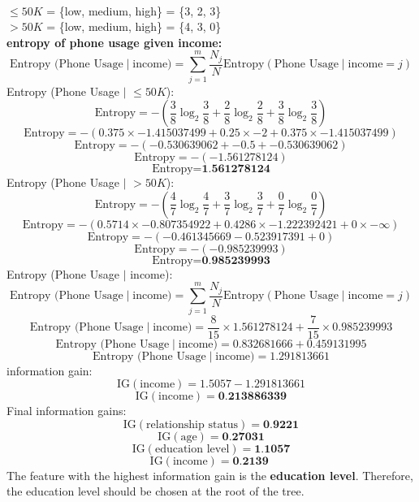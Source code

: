 \documentclass[a3paper,12pt]{extarticle} %
\begin{document}
\begin{enumerate}
    \\ $\leq 50K$ = \{low, medium, high\} = \{3, 2, 3\}
    \\ $> 50K$ = \{low, medium, high\} = \{4, 3, 0\}
    \\ \textbf{entropy of phone usage given income:}
    \[
    \text{Entropy (Phone Usage} \mid \text{income)} = \sum_{j=1}^m \frac{N_j}{N} \text{Entropy}(\text{Phone Usage} \mid \text{income} = j)
    \]
    Entropy (Phone Usage $\mid$ $\leq 50K$):
    \[
    \text{Entropy} = -\left(\frac{3}{8} \log_2 \frac{3}{8} + \frac{2}{8} \log_2 \frac{2}{8} + \frac{3}{8} \log_2 \frac{3}{8}\right)
    \]
    \[
    \text{Entropy} = -\left(0.375 \times -1.415037499 + 0.25 \times -2 + 0.375 \times -1.415037499\right)
    \]
    \[
    \text{Entropy} = -\left(-0.530639062 + -0.5 + -0.530639062\right)
    \]
    \[
    \text{Entropy} = -\left(-1.561278124\right)
    \]
    \[
    \text{Entropy} = \textbf{1.561278124}
    \]
    Entropy (Phone Usage $\mid$ $> 50K$):
    \[
    \text{Entropy} = -\left(\frac{4}{7} \log_2 \frac{4}{7} + \frac{3}{7} \log_2 \frac{3}{7} + \frac{0}{7} \log_2 \frac{0}{7}\right)
    \]
    \[
    \text{Entropy} = -\left(0.5714 \times -0.807354922 + 0.4286 \times -1.222392421 + 0 \times -\infty\right)
    \]
    \[
    \text{Entropy} = -\left(-0.461345669 - 0.523917391 + 0\right)
    \]
    \[
    \text{Entropy} = -\left(-0.985239993\right)
    \]
    \[
    \text{Entropy} = \textbf{0.985239993}
    \]
    Entropy (Phone Usage $\mid$ income):
    \[
    \text{Entropy (Phone Usage} \mid \text{income)} = \sum_{j=1}^m \frac{N_j}{N} \text{Entropy}(\text{Phone Usage} \mid \text{income} = j)
    \]
    \[
    \text{Entropy (Phone Usage} \mid \text{income)} = \frac{8}{15} \times 1.561278124 + \frac{7}{15} \times 0.985239993
    \]
    \[
    \text{Entropy (Phone Usage} \mid \text{income)} = 0.832681666 + 0.459131995
    \]
    \[
    \text{Entropy (Phone Usage} \mid \text{income)} = 1.291813661
    \]
    information gain:
    \[
    \text{IG}(\text{income}) = 1.5057 - 1.291813661
    \]
    \[
    \text{IG}(\text{income}) = \textbf{0.213886339}
    \]
    Final information gains:
    \[
    \text{IG}(\text{relationship status}) = \textbf{0.9221}
    \]
    \[
    \text{IG}(\text{age}) = \textbf{0.27031}
    \]
    \[
    \text{IG}(\text{education level}) = \textbf{1.1057}
    \]
    \[
    \text{IG}(\text{income}) = \textbf{0.2139 }
    \]
    The feature with the highest information gain is the \textbf{education level}. Therefore, the education level should be chosen at the root of the tree.




\end{enumerate}
\end{document}
